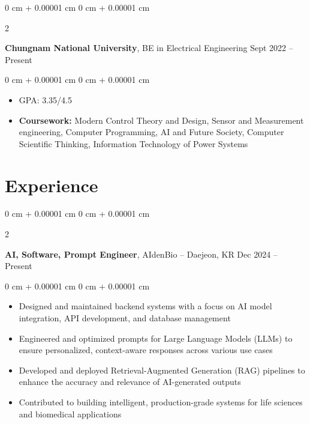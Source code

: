 \documentclass[10pt, letterpaper]{article}
\newenvironment{highlights}{
    \begin{itemize}[
        topsep=0.10 cm,
        parsep=0.10 cm,
        partopsep=0pt,
        itemsep=0pt,
        leftmargin=0 cm + 10pt
    ]
}{
    \end{itemize}
} %
\newenvironment{onecolentry}{
    \begin{adjustwidth}{
        0 cm + 0.00001 cm
    }{
        0 cm + 0.00001 cm
    }
}{
    \end{adjustwidth}
} %
\newenvironment{twocolentry}[2][]{
    \onecolentry
    \def\secondColumn{#2}
    \setcolumnwidth{\fill, 4.5 cm}
    \begin{paracol}{2}
}{
    \switchcolumn \raggedleft \secondColumn
    \end{paracol}
    \endonecolentry
} %
\begin{document}
        \begin{twocolentry}{
            Sept 2022 – Present
        }
            \textbf{Chungnam National University}, BE in Electrical Engineering\end{twocolentry}

        \vspace{0.10 cm}
        \begin{onecolentry}
            \begin{highlights}
                \item GPA: 3.35/4.5
                \item \textbf{Coursework:} Modern Control Theory and Design, Sensor and Measurement engineering, Computer Programming, AI and Future Society, Computer Scientific Thinking, Information Technology of Power Systems

            \end{highlights}
        \end{onecolentry}
   
    \section{Experience}
        
        \begin{twocolentry}{
            Dec 2024 – Present
        }
            \textbf{ AI, Software, Prompt Engineer}, AIdenBio -- Daejeon, KR\end{twocolentry}

        \vspace{0.10 cm}
        \begin{onecolentry}
            \begin{highlights}
                \item Designed and maintained backend systems with a focus on AI model integration, API development, and database management
                \item Engineered and optimized prompts for Large Language Models (LLMs) to ensure personalized, context-aware responses across various use cases
                \item Developed and deployed Retrieval-Augmented Generation (RAG) pipelines to enhance the accuracy and relevance of AI-generated outputs
                \item Contributed to building intelligent, production-grade systems for life sciences and biomedical applications
            \end{highlights}
        \end{onecolentry}
    
\end{document}
